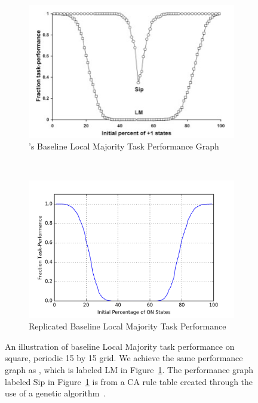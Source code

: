 \documentclass[a4paper,11pt]{article}
\begin{document}
\begin{figure}[htp]
\centering
  \begin{subfigure}[t]{0.45\textwidth}
  \includegraphics[width=\textwidth]{ch5_figs/me07_fig2_LMBaseline}
  \caption{\citeauthor{me07}'s Baseline Local Majority Task Performance Graph}
  \label{fig:me07_baseline}
  \end{subfigure}
  ~
  \begin{subfigure}[t]{0.45\textwidth}
  \centering
  \includegraphics[width=\textwidth]{ch5_figs/lm_baseline_reg_tor}
  \caption{Replicated Baseline Local Majority Task Performance}
  \end{subfigure}
\caption[Replication of \citeauthor{me07}'s Baseline Local Majority Performance]{
  An illustration of baseline Local Majority task performance on square, periodic 15 by 15 grid. We achieve the same performance graph as \citeauthor{me07}, which is labeled LM in Figure~\ref{fig:me07_baseline}. The performance graph labeled Sip in Figure~\ref{fig:me07_baseline} is from a CA rule table created through the use of a genetic algorithm~\cite{me07}.
}
\label{fig:me07_baseline_rep}
\end{figure}
\end{document}
